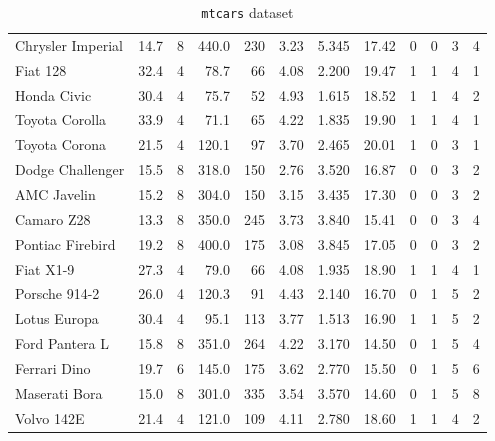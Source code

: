 \documentclass[11pt]{article}
\begin{document}
\begin{appendices}
\begin{table}[h!]
\begin{tabular}{lrrrrrrrrrrr}
Chrysler Imperial   &  14.7 &    8 &  440.0 &  230 &  3.23 &  5.345 &  17.42 &   0 &   0 &     3 &     4 \\
Fiat 128            &  32.4 &    4 &   78.7 &   66 &  4.08 &  2.200 &  19.47 &   1 &   1 &     4 &     1 \\
Honda Civic         &  30.4 &    4 &   75.7 &   52 &  4.93 &  1.615 &  18.52 &   1 &   1 &     4 &     2 \\
Toyota Corolla      &  33.9 &    4 &   71.1 &   65 &  4.22 &  1.835 &  19.90 &   1 &   1 &     4 &     1 \\
Toyota Corona       &  21.5 &    4 &  120.1 &   97 &  3.70 &  2.465 &  20.01 &   1 &   0 &     3 &     1 \\
Dodge Challenger    &  15.5 &    8 &  318.0 &  150 &  2.76 &  3.520 &  16.87 &   0 &   0 &     3 &     2 \\
AMC Javelin         &  15.2 &    8 &  304.0 &  150 &  3.15 &  3.435 &  17.30 &   0 &   0 &     3 &     2 \\
Camaro Z28          &  13.3 &    8 &  350.0 &  245 &  3.73 &  3.840 &  15.41 &   0 &   0 &     3 &     4 \\
Pontiac Firebird    &  19.2 &    8 &  400.0 &  175 &  3.08 &  3.845 &  17.05 &   0 &   0 &     3 &     2 \\
Fiat X1-9           &  27.3 &    4 &   79.0 &   66 &  4.08 &  1.935 &  18.90 &   1 &   1 &     4 &     1 \\
Porsche 914-2       &  26.0 &    4 &  120.3 &   91 &  4.43 &  2.140 &  16.70 &   0 &   1 &     5 &     2 \\
Lotus Europa        &  30.4 &    4 &   95.1 &  113 &  3.77 &  1.513 &  16.90 &   1 &   1 &     5 &     2 \\
Ford Pantera L      &  15.8 &    8 &  351.0 &  264 &  4.22 &  3.170 &  14.50 &   0 &   1 &     5 &     4 \\
Ferrari Dino        &  19.7 &    6 &  145.0 &  175 &  3.62 &  2.770 &  15.50 &   0 &   1 &     5 &     6 \\
Maserati Bora       &  15.0 &    8 &  301.0 &  335 &  3.54 &  3.570 &  14.60 &   0 &   1 &     5 &     8 \\
Volvo 142E          &  21.4 &    4 &  121.0 &  109 &  4.11 &  2.780 &  18.60 &   1 &   1 &     4 &     2 \\
\bottomrule
\end{tabular}
\caption{\texttt{mtcars} dataset}
\label{table:mtcars}
\end{table}
\end{appendices}

\newpage
\nocite{*}

\end{document}
